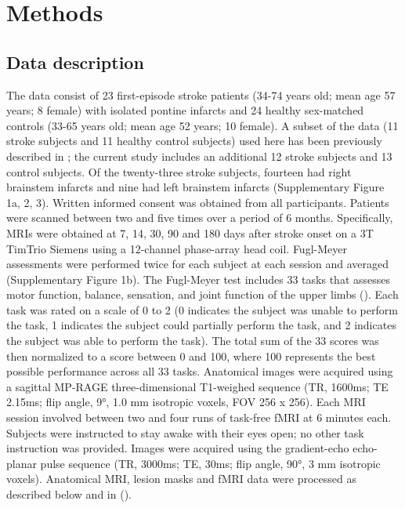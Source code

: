 \documentclass[phd,tocprelim]{cornell}
\begin{document}
\section{Methods}
	\subsection{Data description}
	 The data consist of 23 first-episode stroke patients (34-74 years old; mean age 57 years; 8 female) with isolated pontine infarcts and 24 healthy sex-matched controls (33-65 years old; mean age 52 years; 10 female). A subset of the data (11 stroke subjects and 11 healthy control subjects) used here has been previously described in \cite{Lu2011-ow}; the current study includes an additional 12 stroke subjects and 13 control subjects. Of the twenty-three stroke subjects, fourteen had right brainstem infarcts and nine had left brainstem infarcts (Supplementary Figure 1a, 2, 3). Written informed consent was obtained from all participants. Patients were scanned between two and five times over a period of 6 months. Specifically, MRIs were obtained at 7, 14, 30, 90 and 180 days after stroke onset on a 3T TimTrio Siemens using a 12-channel phase-array head coil. Fugl-Meyer assessments were performed twice for each subject at each session and averaged (Supplementary Figure 1b). The Fugl-Meyer test includes 33 tasks that assesses motor function, balance, sensation, and joint function of the upper limbs (\cite{Fugl-Meyer1975-nh}). Each task was rated on a scale of 0 to 2 (0 indicates the subject was unable to perform the task, 1 indicates the subject could partially perform the task, and 2 indicates the subject was able to perform the task). The total sum of the 33 scores was then normalized to a score between 0 and 100, where 100 represents the best possible performance across all 33 tasks. Anatomical images were acquired using a sagittal MP-RAGE three-dimensional T1-weighed sequence (TR, 1600ms; TE 2.15ms; flip angle, 9°, 1.0 mm isotropic voxels, FOV 256 x 256). Each MRI session involved between two and four runs of task-free fMRI at 6 minutes each. Subjects were instructed to stay awake with their eyes open; no other task instruction was provided. Images were acquired using the gradient-echo echo-planar pulse sequence (TR, 3000ms; TE, 30ms; flip angle, 90°, 3 mm isotropic voxels). Anatomical MRI, lesion masks and fMRI data were processed as described below and in (\cite{Olafson2021-qt}).
	 
 
    	 
\end{document}
